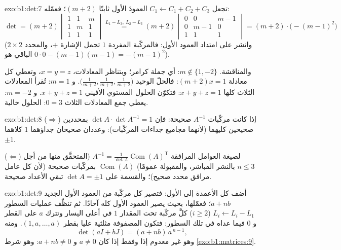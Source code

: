 \begin{solution}{exo:b1:det:7}
تجعل $C_1 \leftarrow C_1 + C_2 + C_3$ العمودَ الأول ثابتًا
$(m+2)$؛ فعمّله:
\[
\det = (m+2)\begin{vmatrix}
1 & 1 & m\\ 1 & m & 1\\ 1 & 1 & 1
\end{vmatrix}
\overset{L_1 - L_3,\ L_2 - L_3}{=}
(m+2)\begin{vmatrix}
0 & 0 & m-1\\ 0 & m-1 & 0\\ 1 & 1 & 1
\end{vmatrix}
= (m+2)\cdot\bigl(-(m-1)^2\bigr)
\]
(وانشر على امتداد العمود الأول: فالمركّبة المفردة $1$ تحمل الإشارة
$+$، والمحدد $2 \times 2$ الباقي هو $0 \cdot 0 -
(m-1)(m-1) = -(m-1)^2$).

والمناقشة. $m \notin \{1, -2\}$: أي جملة كرامر؛ وبتناظر
المعادلات، $x = y = z$، وتعطي كل معادلة $(m + 2)x = 1$:
فالحلّ الوحيد $\bigl(\frac{1}{m+2}, \frac{1}{m+2},
\frac{1}{m+2}\bigr)$. و $m = 1$: تُقرأ المعادلات الثلاث كلها $x + y
+ z = 1$: فتكوّن الحلول المستوي الأفيني $x + y + z = 1$. و $m = -2$:
يعطي جمع المعادلات الثلاث $0 = 3$:  الحلول خالية.
\end{solution}

\begin{solution}{exo:b1:det:8}
($\Rightarrow$) إذا كانت مركّبات $A^{-1}$ صحيحة: فإن $\det A \cdot \det
A^{-1} = 1$ بمحددين صحيحين كليهما (لأنهما مجاميع جداءات
المركّبات): وعددان صحيحان جداؤهما $1$ كلاهما $\pm1$.

($\Leftarrow$) لصيغة العوامل المرافقة $A^{-1} = \frac{1}{\det
A}\operatorname{Com}(A)^{\mathsf T}$ (المتحقَّق منها من أجل $n \leq 3$ بالنشر
المباشر، والمقبولة عمومًا)
$\operatorname{Com}(A)$ بمركّبات صحيحة (لأن كل عامل مرافق
محدد صحيح)؛ والقسمة على $\det A = \pm 1$ تبقي الأعداد صحيحة.
\end{solution}

\begin{solution}{exo:b1:det:9}
أضف كل الأعمدة إلى الأول: فتصير كل مركّبة من العمود الأول الجديد
$a + nb$؛ فعمّلها، بحيث يصير العمود الأول كله آحادًا. ثم
تنظّف عمليات السطور $L_i \leftarrow L_i - L_1$ ($i \geq 2$)
كلَّ مركّبة تحت المقدار $1$ في أعلى اليسار وتترك $a$ على القطر و
$0$ فيما عداه في تلك السطور: فتكون المصفوفة مثلثية عليا بقطر
$(1, a, \dots, a)$. ومنه
\[
\det(aI + bJ) = (a + nb)\, a^{\,n-1} ,
\]
وهو غير معدوم إذا وفقط إذا كان $a \neq 0$ و $a + nb \neq 0$: وهو شرط
\cref{exo:b1:matrices:9}.
\end{solution}

